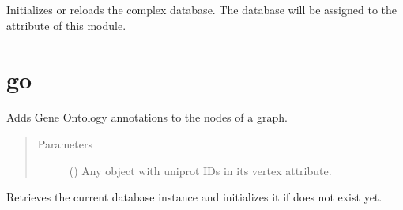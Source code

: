 \documentclass[letterpaper,10pt,english]{sphinxmanual}
\begin{document}

\begin{fulllineitems}
\label{\detokenize{reference:pypath.complex.init_db}}
Initializes or reloads the complex database.
The database will be assigned to the  attribute of this module.

\end{fulllineitems}



\section{go}
\label{\detokenize{reference:module-pypath.go}}\label{\detokenize{reference:go}}

\begin{fulllineitems}
\label{\detokenize{reference:pypath.go.annotate}}
Adds Gene Ontology annotations to the nodes of a graph.
\begin{quote}\begin{description}
\item[{Parameters}] \leavevmode
{} () \textendash{} Any  object with uniprot IDs
in its  vertex attribute.

\end{description}\end{quote}

\end{fulllineitems}


\begin{fulllineitems}
\label{\detokenize{reference:pypath.go.get_db}}
Retrieves the current database instance and initializes it if does
not exist yet.

\end{fulllineitems}
\end{document}
